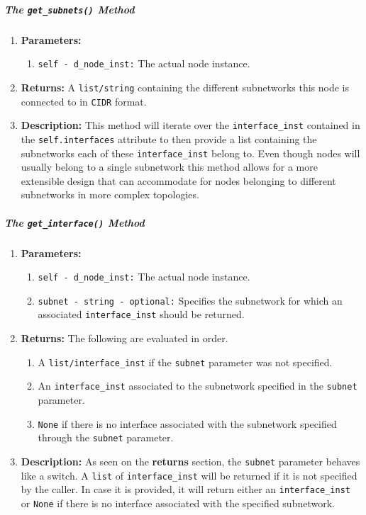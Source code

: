         \subparagraph{The \texttt{get\_subnets()} Method}
            \begin{enumerate}
                \item \textbf{Parameters:}
                \begin{enumerate}
                    \item \texttt{self - d\_node\_inst:} The actual node instance.
                \end{enumerate}
                \item \textbf{Returns:} A \texttt{list/string} containing the different subnetworks this node is connected to in \texttt{CIDR} format.
                \item \textbf{Description:} This method will iterate over the \texttt{interface\_inst} contained in the \texttt{self.interfaces} attribute to then provide a list containing the subnetworks each of these \texttt{interface\_inst} belong to. Even though nodes will usually belong to a single subnetwork this method allows for a more extensible design that can accommodate for nodes belonging to different subnetworks in more complex topologies.
            \end{enumerate}

        \subparagraph{The \texttt{get\_interface()} Method}
            \begin{enumerate}
                \item \textbf{Parameters:}
                \begin{enumerate}
                    \item \texttt{self - d\_node\_inst:} The actual node instance.
                    \item \texttt{subnet - string - optional:} Specifies the subnetwork for which an associated \texttt{interface\_inst} should be returned.
                \end{enumerate}
                \item \textbf{Returns:} The following are evaluated in order.
                \begin{enumerate}
                    \item A \texttt{list/interface\_inst} if the \texttt{subnet} parameter was not specified.
                    \item An \texttt{interface\_inst} associated to the subnetwork specified in the \texttt{subnet} parameter.
                    \item \texttt{None} if there is no interface associated with the subnetwork specified through the \texttt{subnet} parameter.
                \end{enumerate}
                \item \textbf{Description:} As seen on the \textbf{returns} section, the \texttt{subnet} parameter behaves like a switch. A \texttt{list} of \texttt{interface\_inst} will be returned if it is not specified by the caller. In case it is provided, it will return either an \texttt{interface\_inst} or \texttt{None} if there is no interface associated with the specified subnetwork.
            \end{enumerate}

